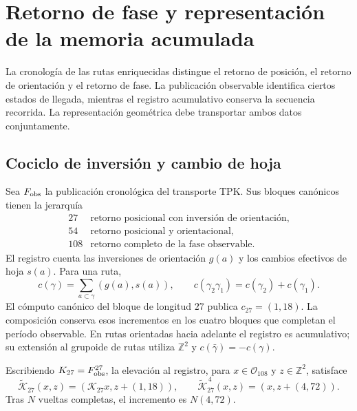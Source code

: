 \chapter{Retorno de fase y representación de la memoria acumulada}
\label{x_reciprocidad:vii:sec:retorno-memoria-gravedad}

La cronología de las rutas enriquecidas distingue el retorno de posición,
el retorno de orientación y el retorno de fase. La publicación observable
identifica ciertos estados de llegada, mientras el registro acumulativo
conserva la secuencia recorrida. La representación geométrica debe
transportar ambos datos conjuntamente.

\section{Cociclo de inversión y cambio de hoja}
\label{x_reciprocidad:vii:subsec:cociclo-memoria}

Sea \(F_{\rm obs}\) la publicación cronológica del transporte TPK.
Sus bloques canónicos tienen la jerarquía
\[
\begin{array}{c|l}
27&\text{retorno posicional con inversión de orientación},\\
54&\text{retorno posicional y orientacional},\\
108&\text{retorno completo de la fase observable}.
\end{array}
\]
El registro cuenta las inversiones de orientación \(g(a)\) y los
cambios efectivos de hoja \(s(a)\). Para una ruta,
\begin{equation}
 c(\gamma)=\sum_{a\subset\gamma}(g(a),s(a)),\qquad
 c(\gamma_2\gamma_1)=c(\gamma_2)+c(\gamma_1).
 \label{x_reciprocidad:vii:eq:cociclo-ruta}
\end{equation}
El cómputo canónico del bloque de longitud \(27\) publica
\(c_{27}=(1,18)\). La composición conserva esos incrementos en
los cuatro bloques que completan el período observable.
En rutas orientadas hacia adelante el registro es acumulativo;
su extensión al grupoide de rutas utiliza \(\mathbb Z^2\) y
\(c(\bar\gamma)=-c(\gamma)\).

\begin{proposition}
\label{x_reciprocidad:vii:prop:memoria-vuelta-completa}
Escribiendo \(\mathcal K_{27}=F_{\rm obs}^{27}\), la elevación
al registro, para \(x\in\mathcal O_{108}\) y \(z\in\mathbb Z^2\), satisface
\[
 \widetilde{\mathcal K}_{27}(x,z)
   =(\mathcal K_{27}x,z+(1,18)),\qquad
 \widetilde{\mathcal K}_{27}^{\,4}(x,z)
   =(x,z+(4,72)).
\]
Tras \(N\) vueltas completas, el incremento es \(N(4,72)\).
\end{proposition}

